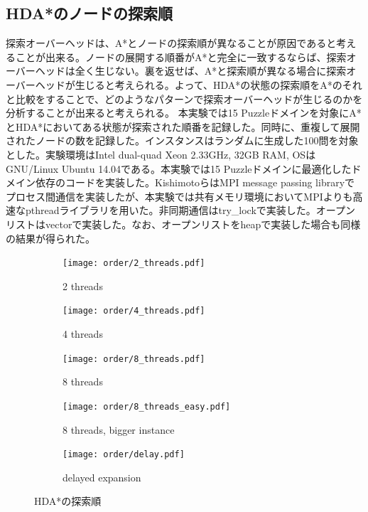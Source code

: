 \documentclass[uplatex]{jsarticle}
\begin{document}
\subsection{HDA*のノードの探索順}
探索オーバーヘッドは、A*とノードの探索順が異なることが原因であると考えることが出来る。ノードの展開する順番がA*と完全に一致するならば、探索オーバーヘッドは全く生じない。裏を返せば、A*と探索順が異なる場合に探索オーバーヘッドが生じると考えられる。よって、HDA*の状態の探索順をA*のそれと比較をすることで、どのようなパターンで探索オーバーヘッドが生じるのかを分析することが出来ると考えられる。
本実験では15 Puzzleドメインを対象にA*とHDA*においてある状態が探索された順番を記録した。同時に、重複して展開されたノードの数を記録した。インスタンスはランダムに生成した100問を対象とした。実験環境はIntel dual-quad Xeon 2.33GHz, 32GB RAM, OSはGNU/Linux Ubuntu 14.04である。本実験では15 Puzzleドメインに最適化したドメイン依存のコードを実装した。KishimotoらはMPI message passing libraryでプロセス間通信を実装したが、本実験では共有メモリ環境においてMPIよりも高速なpthreadライブラリを用いた。非同期通信はtry\_lockで実装した。オープンリストはvectorで実装した。なお、オープンリストをheapで実装した場合も同様の結果が得られた。


\begin{figure}
	\centering
	\begin{subfigure}{0.45\columnwidth}
		\centering
		\texttt{[image: order/2\_threads.pdf]}
		\caption{2 threads}
		\label{fig:order_2_threads}
	\end{subfigure}
	\begin{subfigure}{0.45\columnwidth}
		\centering
		\texttt{[image: order/4\_threads.pdf]}
		\caption{4 threads}
		\label{fig:order_4_threads}
	\end{subfigure}
	\begin{subfigure}{0.45\columnwidth}
		\centering
		\texttt{[image: order/8\_threads.pdf]}
		\caption{8 threads}
		\label{fig:order_8_threads}
	\end{subfigure}
	\begin{subfigure}{0.45\columnwidth}
		\centering
		\texttt{[image: order/8\_threads\_easy.pdf]}
		\caption{8 threads, bigger instance}
		\label{fig:order_8_threads_easy}
	\end{subfigure}
	\begin{subfigure}{0.45\columnwidth}
		\centering
		\texttt{[image: order/delay.pdf]}
		\caption{delayed expansion}
		\label{fig:order_delay}
	\end{subfigure}
	\caption{HDA*の探索順}
	\label{fig:hdastar_orders}
\end{figure}
\end{document}
